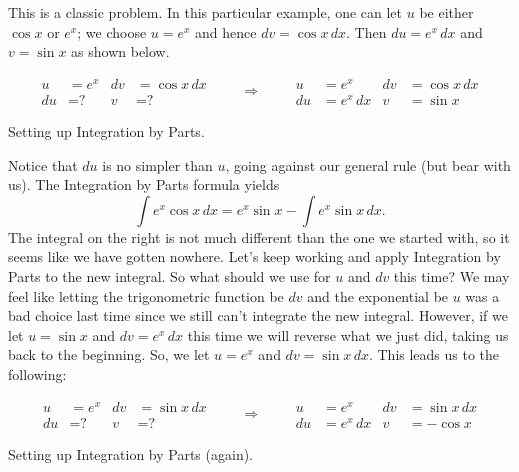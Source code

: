 {This is a classic problem.
In this particular example, one can let $u$ be either $\cos x$ or $e^x$;
we choose $u=e^x$ and hence $dv = \cos x\,dx$.  Then $du=e^x\,dx$ and $v=\sin x$ as shown below.

\begin{lxfigure}
\[
\begin{aligned}
u&= e^x & dv&=\cos x\, dx\\
du&= \text{?} & v&=\text{?}
\end{aligned}
\qquad\Rightarrow\qquad
\begin{aligned}
u&= e^x& dv&=\cos x\, dx\\
du&= e^x\, dx & v&=\sin x
\end{aligned}
\]
\caption{Setting up Integration by Parts.}\label{fig:ibp4}
\end{lxfigure}

Notice that $du$ is no simpler than $u$, going against our general rule (but bear with us). The Integration by Parts formula yields
$$\int e^x\cos x\, dx = e^x\sin x - \int e^x\sin x\,dx.$$
The integral on the right is not much different than the one we started with, so it seems like we have gotten nowhere. Let's  keep working and apply Integration by Parts to the new integral. So what should we use for $u$ and $dv$ this time? We may feel like letting the trigonometric function be $dv$ and the exponential be $u$ was a bad choice last time since we still can't integrate the new integral. However, if we let $u=\sin x$ and $dv=e^x\,dx$ this time we will reverse what we just did, taking us back to the beginning. So, we let $u=e^x$ and $dv = \sin x\,dx$. This leads us to the following:

\begin{lxfigure}
\[
\begin{aligned}
u&= e^x & dv&=\sin x\, dx\\
du&= \text{?} & v&=\text{?}
\end{aligned}
\qquad\Rightarrow\qquad
\begin{aligned}
u&= e^x& dv&=\sin x\, dx\\
du&= e^x\, dx & v&=-\cos x
\end{aligned}
\]
\caption{Setting up Integration by Parts (again).}\label{fig:ibp4a}
\end{lxfigure}

}
